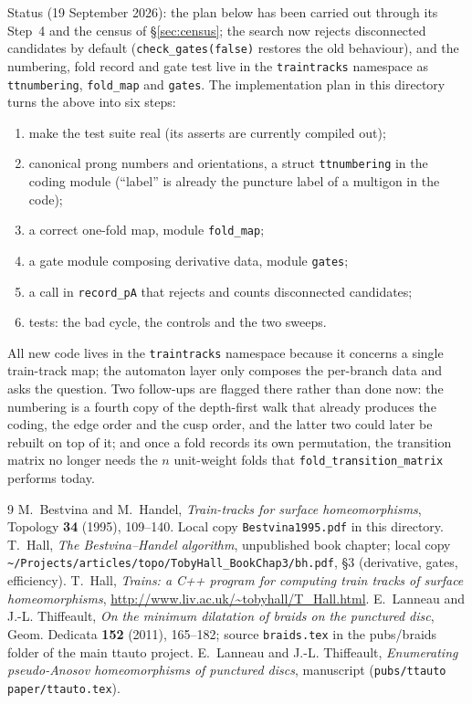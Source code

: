 \documentclass[12pt]{amsart}
\newcommand{\code}[1]{\texttt{#1}}
\theoremstyle{plain}
\theoremstyle{definition}
\begin{document}
Status (19 September 2026): the plan below has been carried out through
its Step~4 and the census of \S\ref{sec:census}; the search now rejects
disconnected candidates by default (\code{check\_gates(false)} restores
the old behaviour), and the numbering, fold record and gate test live in
the \code{traintracks} namespace as \code{ttnumbering}, \code{fold\_map}
and \code{gates}.  The implementation plan in this directory turns the
above into six steps:
\begin{enumerate}
  \item make the test suite real (its asserts are currently compiled out);
  \item canonical prong numbers and orientations, a struct
    \code{ttnumbering} in the coding module (``label'' is already the
    puncture label of a multigon in the code);
  \item a correct one-fold map, module \code{fold\_map};
  \item a gate module composing derivative data, module \code{gates};
  \item a call in \code{record\_pA} that rejects and counts disconnected
    candidates;
  \item tests: the bad cycle, the controls and the two sweeps.
\end{enumerate}
All new code lives in the \code{traintracks} namespace because it concerns
a single train-track map; the automaton layer only composes the per-branch
data and asks the question.  Two follow-ups are flagged there rather than
done now: the numbering is a fourth copy of the depth-first walk that
already produces the coding, the edge order and the cusp order, and the
latter two could later be rebuilt on top of it; and once a fold records its
own permutation, the transition matrix no longer needs the $n$ unit-weight
folds that \code{fold\_transition\_matrix} performs today.

\begin{thebibliography}{9}
 M.~Bestvina and M.~Handel, \emph{Train-tracks for
  surface homeomorphisms}, Topology \textbf{34} (1995), 109--140.  Local
  copy \code{Bestvina1995.pdf} in this directory.
 T.~Hall, \emph{The Bestvina--Handel algorithm},
  unpublished book chapter; local copy
  \code{\textasciitilde/Projects/articles/topo/TobyHall\_BookChap3/bh.pdf},
  \S3 (derivative, gates, efficiency).
 T.~Hall, \emph{Trains: a C++ program for computing
  train tracks of surface homeomorphisms},
  \url{http://www.liv.ac.uk/~tobyhall/T_Hall.html}.
 E.~Lanneau and J.-L. Thiffeault, \emph{On the
  minimum dilatation of braids on the punctured disc}, Geom. Dedicata
  \textbf{152} (2011), 165--182; source \code{braids.tex} in the
  pubs/braids folder of the main ttauto project.
 E.~Lanneau and J.-L. Thiffeault, \emph{Enumerating
  pseudo-Anosov homeomorphisms of punctured discs}, manuscript
  (\code{pubs/ttauto paper/ttauto.tex}).
\end{thebibliography}
\end{document}

